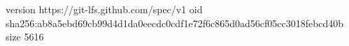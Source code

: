 version https://git-lfs.github.com/spec/v1
oid sha256:ab8a5ebd69cb99d4d1da0eecdc0cdf1e72f6c865d0ad56cf05cc3018febcd40b
size 5616
